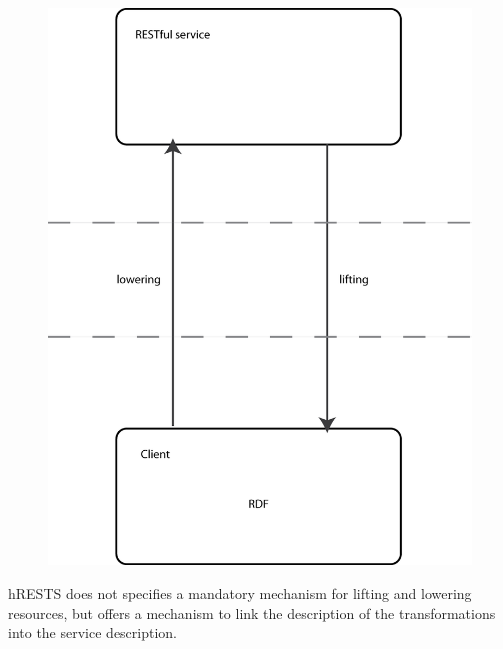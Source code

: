 \begin{figure}[htb!]
\centering%
\includegraphics{lifting_lowering.png}
\end{figure}

hRESTS does not specifies a mandatory mechanism for lifting and lowering resources, but offers a mechanism to link the description of the transformations into the service description.

